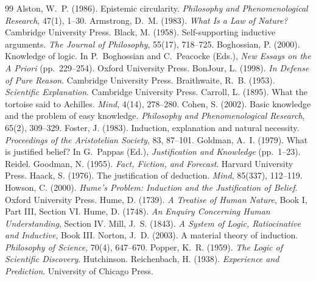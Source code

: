 \documentclass{situationist-preprint}
\begin{document}
\begin{thebibliography}{99}\small
{} Alston, W.~P. (1986). Epistemic circularity. \emph{Philosophy and Phenomenological Research}, 47(1), 1--30.
 Armstrong, D.~M. (1983). \emph{What Is a Law of Nature?} Cambridge University Press.
 Black, M. (1958). Self-supporting inductive arguments. \emph{The Journal of Philosophy}, 55(17), 718--725.
 Boghossian, P. (2000). Knowledge of logic. In P.~Boghossian and C.~Peacocke (Eds.), \emph{New Essays on the A Priori} (pp.~229--254). Oxford University Press.
 BonJour, L. (1998). \emph{In Defense of Pure Reason}. Cambridge University Press.
 Braithwaite, R.~B. (1953). \emph{Scientific Explanation}. Cambridge University Press.
 Carroll, L. (1895). What the tortoise said to Achilles. \emph{Mind}, 4(14), 278--280.
 Cohen, S. (2002). Basic knowledge and the problem of easy knowledge. \emph{Philosophy and Phenomenological Research}, 65(2), 309--329.
 Foster, J. (1983). Induction, explanation and natural necessity. \emph{Proceedings of the Aristotelian Society}, 83, 87--101.
 Goldman, A.~I. (1979). What is justified belief? In G.~Pappas (Ed.), \emph{Justification and Knowledge} (pp.~1--23). Reidel.
 Goodman, N. (1955). \emph{Fact, Fiction, and Forecast}. Harvard University Press.
 Haack, S. (1976). The justification of deduction. \emph{Mind}, 85(337), 112--119.
 Howson, C. (2000). \emph{Hume's Problem: Induction and the Justification of Belief}. Oxford University Press.
 Hume, D. (1739). \emph{A Treatise of Human Nature}, Book I, Part III, Section VI.
 Hume, D. (1748). \emph{An Enquiry Concerning Human Understanding}, Section IV.
 Mill, J.~S. (1843). \emph{A System of Logic, Ratiocinative and Inductive}, Book III.
 Norton, J.~D. (2003). A material theory of induction. \emph{Philosophy of Science}, 70(4), 647--670.
 Popper, K.~R. (1959). \emph{The Logic of Scientific Discovery}. Hutchinson.
 Reichenbach, H. (1938). \emph{Experience and Prediction}. University of Chicago Press.

\end{thebibliography}
\end{document}
